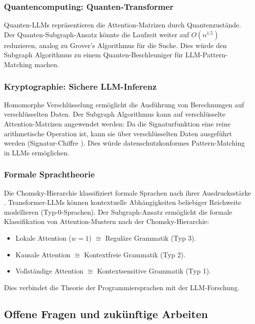 ﻿\documentclass[a4paper,12pt]{article}
\theoremstyle{definition}
\begin{document}
\subsubsection{Quantencomputing: Quanten-Transformer}

Quanten-LLMs \cite{gao2021enhancing} repräsentieren die Attention-Matrizen
durch Quantenzustände. Der Quanten-Subgraph-Ansatz könnte die Laufzeit
weiter auf $O(n^{1.5})$ reduzieren, analog zu Grover's Algorithmus für
die Suche. Dies würde den Subgraph Algorithmus zu einem Quanten-Beschleuniger
für LLM-Pattern-Matching machen.

\subsubsection{Kryptographie: Sichere LLM-Inferenz}

Homomorphe Verschlüsselung ermöglicht die Ausführung von Berechnungen
auf verschlüsselten Daten. Der Subgraph Algorithmus kann auf
verschlüsselte Attention-Matrizen angewendet werden: Da die Signaturfunktion
eine reine arithmetische Operation ist, kann sie über verschlüsselten
Daten ausgeführt werden (Signatur-Chiffre \cite{epp2026sigchiffre}).
Dies würde datenschutzkonformes Pattern-Matching in LLMs ermöglichen.

\subsubsection{Formale Sprachtheorie}

Die Chomsky-Hierarchie klassifiziert formale Sprachen nach ihrer
Ausdrucksstärke \cite{chomsky1956three}. Transformer-LLMs können kontextuelle
Abhängigkeiten beliebiger Reichweite modellieren (Typ-0-Sprachen).
Der Subgraph-Ansatz ermöglicht die formale Klassifikation von
Attention-Mustern nach der Chomsky-Hierarchie:
\begin{itemize}
	\item Lokale Attention ($w = 1$) $\cong$ Reguläre Grammatik (Typ 3).
	\item Kausale Attention $\cong$ Kontextfreie Grammatik (Typ 2).
	\item Vollständige Attention $\cong$ Kontextsensitive Grammatik (Typ 1).
\end{itemize}
Dies verbindet die Theorie der Programmiersprachen mit der LLM-Forschung.

\subsection{Offene Fragen und zukünftige Arbeiten}
\end{document}
